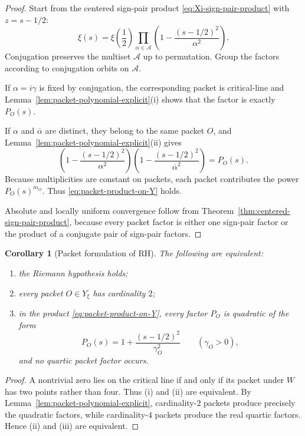 \documentclass[11pt,a4paper]{article}
\numberwithin{equation}{section}
\newtheorem{corollary}[theorem]{Corollary}
\theoremstyle{definition}
\theoremstyle{remark}
\begin{document}
\begin{proof}
Start from the centered sign-pair product \eqref{eq:Xi-sign-pair-product} with $z=s-1/2$:
\[
\xi(s)=\xi\!\left(\frac12\right)\prod_{\alpha\in\mathcal A}\left(1-\frac{(s-1/2)^2}{\alpha^2}\right).
\]
Conjugation preserves the multiset $\mathcal A$ up to permutation.  Group the factors according to conjugation orbits on $\mathcal A$.

If $\alpha=i\gamma$ is fixed by conjugation, the corresponding packet is critical-line and Lemma~\ref{lem:packet-polynomial-explicit}(i) shows that the factor is exactly $P_O(s)$.

If $\alpha$ and $\overline\alpha$ are distinct, they belong to the same packet $O$, and Lemma~\ref{lem:packet-polynomial-explicit}(ii) gives
\[
\left(1-\frac{(s-1/2)^2}{\alpha^2}\right)
\left(1-\frac{(s-1/2)^2}{\overline\alpha^2}\right)
=P_O(s).
\]
Because multiplicities are constant on packets, each packet contributes the power $P_O(s)^{m_O}$.  Thus \eqref{eq:packet-product-on-Y} holds.

Absolute and locally uniform convergence follow from Theorem~\ref{thm:centered-sign-pair-product}, because every packet factor is either one sign-pair factor or the product of a conjugate pair of sign-pair factors.
\end{proof}

\begin{corollary}[Packet formulation of RH]\label{cor:RH-packet-criterion}
The following are equivalent:
\begin{enumerate}[label=(\roman*)]
\item the Riemann hypothesis holds;
\item every packet $O\in Y_\xi$ has cardinality $2$;
\item in the product \eqref{eq:packet-product-on-Y}, every factor $P_O$ is quadratic of the form
\[
P_O(s)=1+\frac{(s-1/2)^2}{\gamma_O^2}
\qquad (\gamma_O>0),
\]
and no quartic packet factor occurs.
\end{enumerate}
\end{corollary}

\begin{proof}
A nontrivial zero lies on the critical line if and only if its packet under $W$ has two points rather than four.  Thus (i) and (ii) are equivalent.  By Lemma~\ref{lem:packet-polynomial-explicit}, cardinality-$2$ packets produce precisely the quadratic factors, while cardinality-$4$ packets produce the real quartic factors.  Hence (ii) and (iii) are equivalent.
\end{proof}
\end{document}
